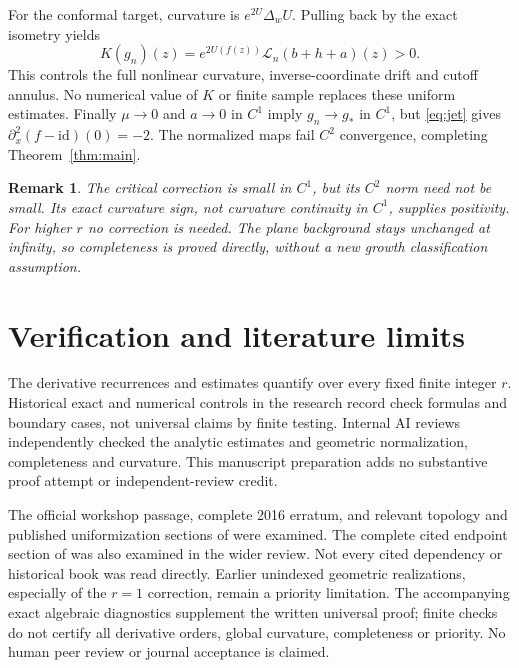 \documentclass[11pt]{article}
\newtheorem{remark}{Remark}
\newcommand{\id}{\mathrm{id}}
\begin{document}
For the conformal target, curvature is $e^{2U}\Delta_w U$. Pulling back by the exact isometry yields
\[
 K(g_n)(z)=e^{2U(f(z))}\mathcal L_n(b+h+a)(z)>0.
\]
This controls the full nonlinear curvature, inverse-coordinate drift and cutoff annulus. No numerical value of $K$ or finite sample replaces these uniform estimates. Finally $\mu\to0$ and $a\to0$ in $C^1$ imply $g_n\to g_*$ in $C^1$, but \eqref{eq:jet} gives $\partial_x^2(f-\id)(0)=-2$. The normalized maps fail $C^2$ convergence, completing Theorem~\ref{thm:main}.

\begin{remark}
The critical correction is small in $C^1$, but its $C^2$ norm need not be small. Its exact curvature sign, not curvature continuity in $C^1$, supplies positivity. For higher $r$ no correction is needed. The plane background stays unchanged at infinity, so completeness is proved directly, without a new growth classification assumption.
\end{remark}

\section*{Verification and literature limits}
The derivative recurrences and estimates quantify over every fixed finite integer $r$. Historical exact and numerical controls in the research record check formulas and boundary cases, not universal claims by finite testing. Internal AI reviews independently checked the analytic estimates and geometric normalization, completeness and curvature. This manuscript preparation adds no substantive proof attempt or independent-review credit.

The official workshop passage, complete 2016 erratum, and relevant topology and published uniformization sections of \cite{BB18} were examined. The complete cited endpoint section of \cite{MSS22} was also examined in the wider review. Not every cited dependency or historical book was read directly. Earlier unindexed geometric realizations, especially of the $r=1$ correction, remain a priority limitation. The accompanying exact algebraic diagnostics supplement the written universal proof; finite checks do not certify all derivative orders, global curvature, completeness or priority. No human peer review or journal acceptance is claimed.
\end{document}
